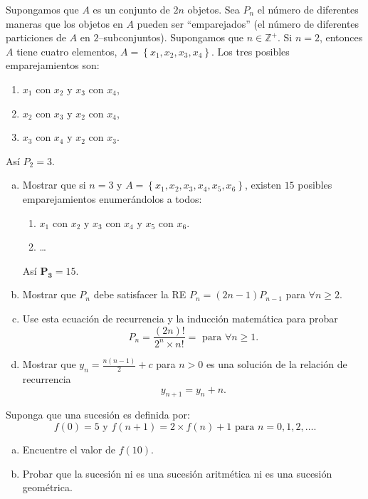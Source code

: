 \begin{exercise}
Supongamos que $A$ es un conjunto de $2n$ objetos. Sea $P_{n}$ el número de diferentes maneras que los objetos en $A$ pueden ser ``emparejados'' (el número de diferentes particiones de $A$ en $2$--subconjuntos). Supongamos que $n\in\mathds{Z}^{+}$. Si $n=2$, entonces $A$ tiene cuatro elementos, $A=\left\{x_1,x_2,x_3,x_4\right\}$. Los tres posibles emparejamientos son:
\begin{enumerate}
	\item $x_{1}$ con $x_{2}$ y $x_{3}$ con $x_{4}$,
	\item $x_{2}$ con $x_{3}$ y $x_{2}$ con $x_{4}$,
	\item $x_{3}$ con $x_{4}$ y $x_{2}$ con $x_{3}$.
\end{enumerate}
Así $P_{2}=3$.
\end{exercise}
\begin{enumerate}[(a)]%
	\item Mostrar que si $n=3$ y $A=\left\{x_{1},x_{2},x_{3},x_{4},x_{5},x_{6}\right\}$, existen $15$ posibles emparejamientos enumerándolos a todos:
	\begin{enumerate}
		\item $x_{1}$ con $x_{2}$ y $x_{3}$ con $x_{4}$ y $x_{5}$ con $x_{6}$.
		\item \ldots
	\end{enumerate}
	Así $\bm{P_3}=15$.
	\item Mostrar que $P_{n}$ debe satisfacer la RE $P_{n}=(2n-1)P_{n-1}$ para $\forall n\geq2$.
	\item Use esta ecuación de recurrencia y la inducción matemática para probar \[ P_{n}=\frac{(2n)!}{2^n\times n!}=\text{ para }\forall n\geq 1. \]
	\item Mostrar que $y_{n}=\frac{n(n-1)}{2}+c$ para $n>0$ es una solución de la relación de recurrencia \[ y_{n+1}=y_{n}+n. \]
\end{enumerate}

\begin{solution}
	
\end{solution}

\begin{exercise}
Suponga que una sucesión es definida por: \[ f(0)=5\text{ y }f(n+1)=2\times f(n)+1\text{ para } n=0,1,2,\ldots. \]
\begin{enumerate}[(a)]
	\item Encuentre el valor de $f(10)$.
	\item Probar que la sucesión ni es una sucesión aritmética ni es una sucesión geométrica.
\end{enumerate}
\end{exercise}

